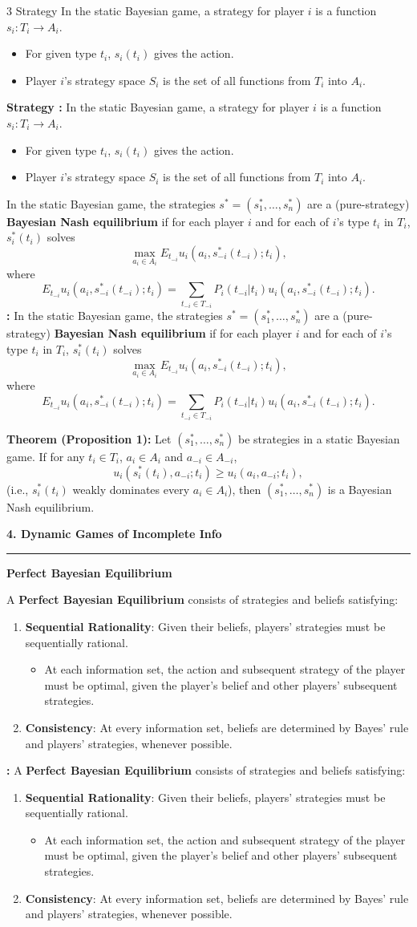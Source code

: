 \documentclass[a4paper,landscape,8pt]{article}
\newcommand{\heading}[1]{\noindent\textbf{\textcolor{heading}{\large #1}}\\\rule{\linewidth}{1pt}}
\newcommand{\subheading}[1]{\vspace{1pt}\noindent\textbf{\textcolor{subheading}{#1}}}
\newcommand{\definition}[2][]{\vspace{1pt}\noindent%
  \ifx\relax#1\relax%
    #2%
  \else%
    \textbf{#1 :} #2%
  \fi}
\newcommand{\theorem}[2]{\vspace{1pt}\noindent\textbf{Theorem (#1):} #2}
\begin{document}
\begin{multicols}{3}
	\definition[Strategy]{In the static Bayesian game, a strategy for player $i$ is a function $s_i: T_i \rightarrow A_i$.
		\begin{itemize}[leftmargin=10pt,itemsep=0pt]
			\item For given type $t_i$, $s_i(t_i)$ gives the action.
			\item Player $i$'s strategy space $S_i$ is the set of all functions from $T_i$ into $A_i$.
		\end{itemize}}

	\definition{In the static Bayesian game, the strategies $s^* = (s_1^*, \ldots, s_n^*)$ are a (pure-strategy) \textbf{Bayesian Nash equilibrium} if for each player $i$ and for each of $i$'s type $t_i$ in $T_i$, $s_i^*(t_i)$ solves
		\begin{equation*}
			\max_{a_i \in A_i} E_{t_{-i}}u_i(a_i, s_{-i}^*(t_{-i}); t_i),
		\end{equation*}
		where
		\begin{equation*}
			E_{t_{-i}} u_i(a_i, s_{-i}^*(t_{-i}); t_i) = \sum_{t_{-i} \in T_{-i}} P_i(t_{-i}|t_i)u_i(a_i, s_{-i}^*(t_{-i}); t_i).
		\end{equation*}}

	\theorem{Proposition 1}{Let $(s_1^*, \ldots, s_n^*)$ be strategies in a static Bayesian game. If for any $t_i \in T_i$, $a_i \in A_i$ and $a_{-i} \in A_{-i}$,
		\begin{equation*}
			u_i(s_i^*(t_i), a_{-i}; t_i) \geq u_i(a_i, a_{-i}; t_i),
		\end{equation*}
		(i.e., $s_i^*(t_i)$ weakly dominates every $a_i \in A_i$), then $(s_1^*, \ldots, s_n^*)$ is a Bayesian Nash equilibrium.}

	\heading{4. Dynamic Games of Incomplete Info}

	\subheading{Perfect Bayesian Equilibrium}

	\definition{A \textbf{Perfect Bayesian Equilibrium} consists of strategies and beliefs satisfying:
		\begin{enumerate}
			\item \textbf{Sequential Rationality}: Given their beliefs, players' strategies must be sequentially rational.
			      \begin{itemize}
				      \item At each information set, the action and subsequent strategy of the player must be optimal, given the player's belief and other players' subsequent strategies.
			      \end{itemize}
			\item \textbf{Consistency}: At every information set, beliefs are determined by Bayes' rule and players' strategies, whenever possible.
		\end{enumerate}
	}


\end{multicols}
\end{document}
